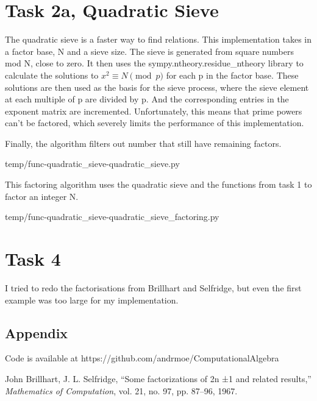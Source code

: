 \documentclass[12pt,a4paper]{article}
\begin{document}
\section*{Task 2a, Quadratic Sieve}

The quadratic sieve is a faster way to find relations.
This implementation takes in a factor base, N and a sieve size.
The sieve is generated from square numbers mod N, close to zero.
It then uses the  sympy.ntheory.residue\_ntheory library to calculate the solutions to \(x^2 \equiv N \pmod{p}\) for
each p in the factor base.
These solutions are then used as the basis for the sieve process, where the sieve element at each multiple of p are
divided by p.
And the corresponding entries in the exponent matrix are incremented.
Unfortunately, this means that prime powers can't be factored, which severely limits the performance of this
implementation.

Finally, the algorithm filters out number that still have remaining factors.


{temp/func-quadratic_sieve-quadratic_sieve.py}

This factoring algorithm uses the quadratic sieve and the functions from task 1 to factor an integer N.


{temp/func-quadratic_sieve-quadratic_sieve_factoring.py}

\section*{Task 4}

I tried to redo the factorisations from Brillhart and Selfridge\cite{brillhartselfridge}, but even the first example
was too large for my implementation.

\newpage
\begin{appendix}
\section*{Appendix}
    Code is available at https://github.com/andrmoe/ComputationalAlgebra
    
    
    
    
    
\end{appendix}


\begin{thebibliography}{1}

John Brillhart, J. L. Selfridge, ``Some factorizations of 2n ±1 and related results,'' \textit{Mathematics of Computation}, vol. 21, no. 97, pp. 87--96, 1967.

\end{thebibliography}
\end{document}
